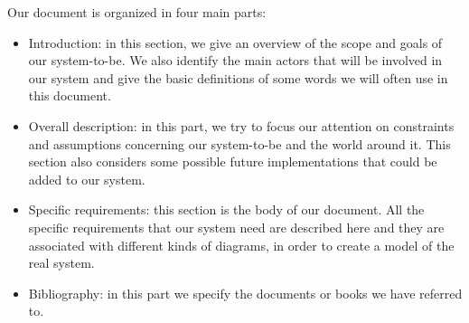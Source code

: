 Our document is organized in four main parts:
\begin{itemize}
	\item Introduction: in this section, we give an overview of the scope and goals of our system-to-be. We also identify the main actors that will be involved in our system and give the basic definitions of some words we will often use in this document.
	\item Overall description: in this part, we try to focus our attention on constraints and assumptions concerning our system-to-be and the world around it. This section also considers some possible future implementations that could be added to our system.
	\item Specific requirements: this section is the body of our document. All the specific requirements that our system need are described here and they are associated with different kinds of diagrams, in order to create a model of the real system.
	\item Bibliography: in this part we specify the documents or books we have referred to.
\end{itemize}